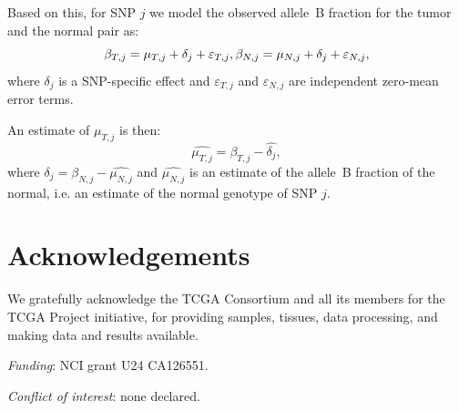 \documentclass[draft]{bioinfo}
\newcommand{\eps}{\varepsilon\xspace}
\begin{document}
Based on this, for SNP $j$ we model the observed allele~B fraction for the tumor and the normal pair as:
\begin{equation}
  \beta_{T,j} = \mu_{T,j} + \delta_{j} + \eps_{T,j},\\
  \beta_{N,j} = \mu_{N,j} + \delta_{j} + \eps_{N,j},
  \label{eqnFracBModel}
\end{equation}
where $\delta_{j}$ is a SNP-specific effect and $\eps_{T,j}$ and $\eps_{N,j}$ are independent zero-mean error terms.

An estimate of $\mu_{T,j}$ is then:
\begin{equation}
  \hat{\mu_{T,j}} = \beta_{T,j} - \hat{\delta_{j}},
  \label{eqnTumorBoostEstimate}
\end{equation}
where $\hat{\delta_{j}} = \beta_{N,j} - \hat{\mu_{N,j}}$ and $\hat{\mu_{N,j}}$ is an estimate of the allele~B fraction of the normal, i.e. an estimate of the normal genotype of SNP $j$.



\section*{Acknowledgements}
We gratefully acknowledge the TCGA Consortium and all its members for the TCGA Project initiative, for providing samples, tissues, data processing, and making data and results available.

\emph{Funding}: NCI grant U24 CA126551.

\emph{Conflict of interest}: none declared.


\begin{methods}


\end{methods}
 
\end{document}
